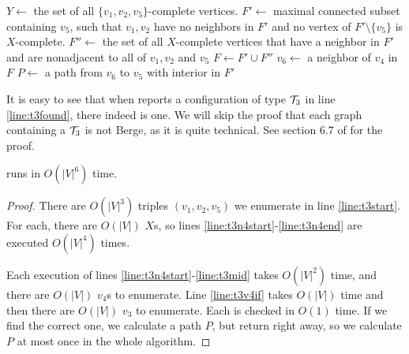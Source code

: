 \begin{algorithmic}[1]
		\ls $Y \gets$ the set of all $\{v_1, v_2, v_5\}$-complete vertices.
			\ls $F' \gets$ maximal connected subset containing $v_5$, such that $v_1, v_2$ \label{line:t3n4start}
			\lsx have no neighbors in $F'$ and no vertex of $F'\setminus\{v_5\}$ is $X$-complete.
			\ls $F'' \gets$ the set of all $X$-complete vertices that have a neighbor in 
			\lsx $F'$ and are nonadjacent to all of $v_1, v_2$ and $v_5$
			\ls $F \gets F' \cup F''$ \label{line:t3mid}
					\ls $v_6 \gets$ a neighbor of $v_4$ in $F$
							\ls $P \gets$ a path from $v_6$ to $v_5$ with interior in $F'$
							\ls \RETURN \TRUE {} \label{line:t3found}
						\mEndIf
					\mEndFor
				\mEndIf
			\mEndFor \label{line:t3n4end}
		\mEndFor
	\mEndFor
	\ls \RETURN \FALSE
	\mEndProcedure
\end{algorithmic}

It is easy to see that when  reports a configuration of type $\mathcal{T}_3$ in line \ref{line:t3found}, there indeed is one. We will skip the proof that each graph containing a $\mathcal{T}_3$ is not Berge, as it is quite technical. See section 6.7 of \cite{MC05} for the proof.

\begin{theorem}
	\label{thm:t3Time}
	 runs in $O(|V|^6)$ time.
\end{theorem}
\begin{proof}
	There are $O(|V|^3)$ triples $(v_1, v_2, v_5)$ we enumerate in line \ref{line:t3start}. For each, there are $O(|V|)$ $X$s, so lines \ref{line:t3n4start}-\ref{line:t3n4end} are executed $O(|V|^4)$ times.

	Each execution of lines \ref{line:t3n4start}-\ref{line:t3mid} takes $O(|V|^2)$ time, and there are $O(|V|)$ $v_4$s to enumerate. Line \ref{line:t3v4if} takes $O(|V|)$ time and then there are $O(|V|)$ $v_3$ to enumerate. Each is checked in $O(1)$ time. If we find the correct one, we calculate a path $P$, but return right away, so we calculate $P$ at most once in the whole algorithm.
\end{proof}

